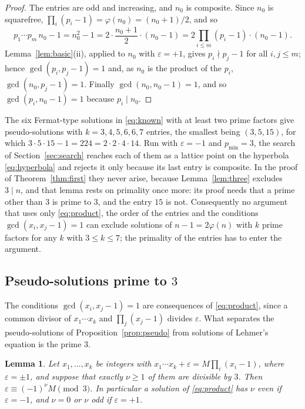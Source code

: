 \documentclass[11pt,reqno]{amsart}
\numberwithin{equation}{section}
\theoremstyle{plain}
\newtheorem{lemma}[theorem]{Lemma}
\theoremstyle{definition}
\theoremstyle{remark}
\begin{document}
\begin{proof}
The entries are odd and increasing, and $n_0$ is composite. Since $n_0$
is squarefree, $\prod_i(p_i-1)=\varphi(n_0)=(n_0+1)/2$, and so
\[
  p_1\cdots p_m\,n_0-1=n_0^2-1=2\cdot\frac{n_0+1}{2}\cdot(n_0-1)
  =2\prod_{i\le m}(p_i-1)\cdot(n_0-1).
\]
Lemma~\ref{lem:basic}(ii), applied to $n_0$ with $\varepsilon=+1$,
gives $p_i\nmid p_j-1$ for all $i,j\le m$; hence $\gcd(p_i,p_j-1)=1$
and, as $n_0$ is the product of the $p_i$, $\gcd(n_0,p_j-1)=1$.
Finally $\gcd(n_0,n_0-1)=1$, and so $\gcd(p_i,n_0-1)=1$ because
$p_i\mid n_0$.
\end{proof}

The six Fermat-type solutions in \eqref{eq:known} with at least two
prime factors give pseudo-solutions with $k=3,4,5,6,6,7$ entries, the
smallest being $(3,5,15)$, for which $3\cdot5\cdot15-1=224=2\cdot2\cdot4\cdot14$.
Run with $\varepsilon=-1$ and $p_{\min}=3$, the search of
Section~\ref{sec:search} reaches each of them as a lattice point on
the hyperbola \eqref{eq:hyperbola} and rejects it only because its last
entry is composite. In the proof of Theorem~\ref{thm:first} they never
arise, because Lemma~\ref{lem:three} excludes $3\mid n$, and that
lemma rests on primality once more: its proof needs that a prime other
than $3$ is prime to $3$, and the entry $15$ is not.
Consequently no argument that uses only \eqref{eq:product}, the order
of the entries and the conditions $\gcd(x_i,x_j-1)=1$ can exclude
solutions of $n-1=2\varphi(n)$ with $k$ prime factors for any $k$ with
$3\le k\le7$; the primality of the entries has to enter the argument.

\subsection{Pseudo-solutions prime to \texorpdfstring{$3$}{3}}
The conditions $\gcd(x_i,x_j-1)=1$ are consequences of
\eqref{eq:product}, since a common divisor of $x_1\cdots x_k$ and
$\prod_j(x_j-1)$ divides $\varepsilon$. What separates the
pseudo-solutions of Proposition~\ref{prop:pseudo} from solutions of
Lehmer's equation is the prime $3$.

\begin{lemma}\label{lem:parity}
Let $x_1,\dots,x_k$ be integers with
$x_1\cdots x_k+\varepsilon=M\prod_i(x_i-1)$, where
$\varepsilon=\pm1$, and suppose that exactly $\nu\ge1$ of them are
divisible by $3$. Then $\varepsilon\equiv(-1)^{\nu}M\pmod3$. In particular
a solution of \eqref{eq:product} has $\nu$ even if $\varepsilon=-1$, and
$\nu=0$ or $\nu$ odd if $\varepsilon=+1$.
\end{lemma}
\end{document}
